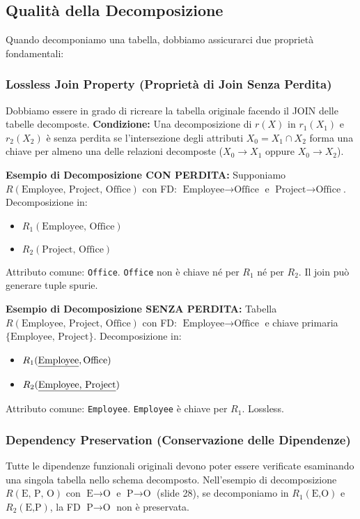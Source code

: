 \documentclass{article}
\begin{document}
	\subsection{Qualità della Decomposizione}
	Quando decomponiamo una tabella, dobbiamo assicurarci due proprietà fondamentali:
	
	\subsubsection{Lossless Join Property (Proprietà di Join Senza Perdita)}
	Dobbiamo essere in grado di ricreare la tabella originale facendo il JOIN delle tabelle decomposte.
	\textbf{Condizione:} Una decomposizione di $r(X)$ in $r_1(X_1)$ e $r_2(X_2)$ è senza perdita se l'intersezione degli attributi $X_0 = X_1 \cap X_2$ forma una chiave per almeno una delle relazioni decomposte ($X_0 \rightarrow X_1$ oppure $X_0 \rightarrow X_2$).
	
	\textbf{Esempio di Decomposizione CON PERDITA:}
	Supponiamo $R(\text{Employee, Project, Office})$ con FD: $\text{Employee} \rightarrow \text{Office}$ e $\text{Project} \rightarrow \text{Office}$.
	Decomposizione in:
	\begin{itemize}
		\item $R_1(\text{Employee, Office})$
		\item $R_2(\text{Project, Office})$
	\end{itemize}
	Attributo comune: \texttt{Office}. \texttt{Office} non è chiave né per $R_1$ né per $R_2$. Il join può generare tuple spurie.
	
	\textbf{Esempio di Decomposizione SENZA PERDITA:}
	Tabella $R(\text{Employee, Project, Office})$ con FD: $\text{Employee} \rightarrow \text{Office}$ e chiave primaria $\{\text{Employee, Project}\}$.
	Decomposizione in:
	\begin{itemize}
		\item $R_1(\text{\underline{Employee}}, \text{Office})$
		\item $R_2(\text{\underline{Employee, Project}})$
	\end{itemize}
	Attributo comune: \texttt{Employee}. \texttt{Employee} è chiave per $R_1$. Lossless.
	
	\subsubsection{Dependency Preservation (Conservazione delle Dipendenze)}
	Tutte le dipendenze funzionali originali devono poter essere verificate esaminando una singola tabella nello schema decomposto.
	Nell'esempio di decomposizione $R(\text{E, P, O})$ con $\text{E} \rightarrow \text{O}$ e $\text{P} \rightarrow \text{O}$ (slide 28), se decomponiamo in $R_1(\text{E,O})$ e $R_2(\text{E,P})$, la FD $\text{P} \rightarrow \text{O}$ non è preservata.
	
\end{document}
